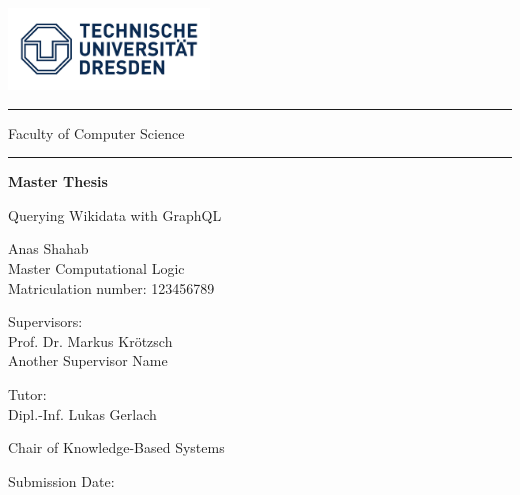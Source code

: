 \begin{titlepage}

\includegraphics[width=0.4\textwidth]{logo.jpg}

\LARGE
\hrule
\vspace*{0.20cm}
Faculty of  Computer Science
\vspace*{0.15cm}
\hrule

    \begin{center}
        \vspace*{1cm}       
            
        \Huge
        \textbf{Master Thesis}
            
        \vspace{0.5cm}
        \LARGE
        Querying Wikidata with GraphQL
            
        \vspace{2cm}
        
        
        
	 \begin{flushleft}
		Anas Shahab \\
    		Master Computational Logic \\
    		Matriculation number: 123456789
    		
    		\vspace{1cm}
    		
    		Supervisors: \\
    		Prof. Dr. Markus Kr{\"otzsch} \\
    		Another Supervisor Name
    		\vspace{0.5cm}
    		
    		Tutor: \\
    		Dipl.-Inf. Lukas Gerlach
    		
    		\vspace{0.5cm}
    		
    		Chair of Knowledge-Based Systems
    		
    		\vspace{1cm}
    		
    		Submission Date:
    \end{flushleft}
                  
         
            
    \end{center}
\end{titlepage}